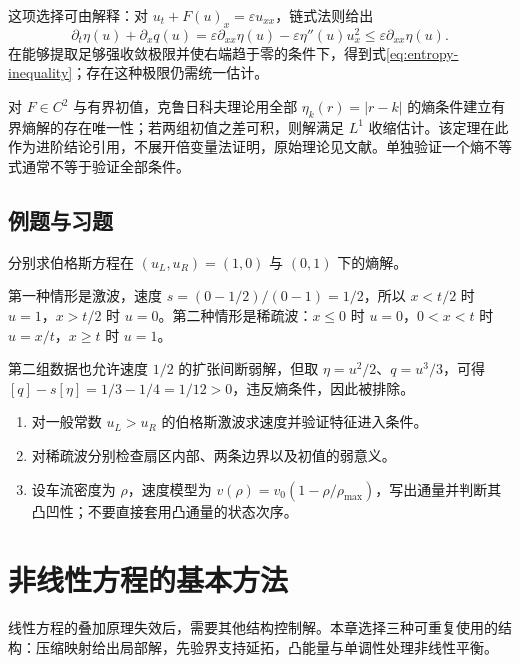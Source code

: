 \documentclass[UTF8,12pt,a4paper,fontset=fandol]{ctexbook}
\begin{document}
这项选择可由解释：对 $u_t+F(u)_x=\varepsilon u_{xx}$，链式法则给出
\[
 \partial_t\eta(u)+\partial_xq(u)
 =\varepsilon\partial_{xx}\eta(u)-\varepsilon\eta''(u)u_x^2
 \le\varepsilon\partial_{xx}\eta(u).
\]
在能够提取足够强收敛极限并使右端趋于零的条件下，得到式\eqref{eq:entropy-inequality}；存在这种极限仍需统一估计。

对 $F\in C^2$ 与有界初值，克鲁日科夫理论用全部 $\eta_k(r)=|r-k|$ 的熵条件建立有界熵解的存在唯一性；若两组初值之差可积，则解满足 $L^1$ 收缩估计。该定理在此作为进阶结论引用，不展开倍变量法证明，原始理论见文献\cite{kruzhkov}。单独验证一个熵不等式通常不等于验证全部条件。

\section{例题与习题}
\begin{example}
分别求伯格斯方程在 $(u_L,u_R)=(1,0)$ 与 $(0,1)$ 下的熵解。
\end{example}
\begin{solve}
第一种情形是激波，速度 $s=(0-1/2)/(0-1)=1/2$，所以 $x<t/2$ 时 $u=1$，$x>t/2$ 时 $u=0$。第二种情形是稀疏波：$x\le0$ 时 $u=0$，$0<x<t$ 时 $u=x/t$，$x\ge t$ 时 $u=1$。

第二组数据也允许速度 $1/2$ 的扩张间断弱解，但取 $\eta=u^2/2$、$q=u^3/3$，可得 $[q]-s[\eta]=1/3-1/4=1/12>0$，违反熵条件，因此被排除。
\end{solve}
\begin{enumerate}
 \item 对一般常数 $u_L>u_R$ 的伯格斯激波求速度并验证特征进入条件。
 \item 对稀疏波分别检查扇区内部、两条边界以及初值的弱意义。
 \item 设车流密度为 $\rho$，速度模型为 $v(\rho)=v_0(1-\rho/\rho_{\max})$，写出通量并判断其凸凹性；不要直接套用凸通量的状态次序。
\end{enumerate}

\chapter{非线性方程的基本方法}
\label{chap:nonlinear}

线性方程的叠加原理失效后，需要其他结构控制解。本章选择三种可重复使用的结构：压缩映射给出局部解，先验界支持延拓，凸能量与单调性处理非线性平衡。
\end{document}
